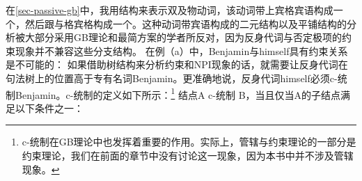 在\ref{sec-passive-gb}中，我用\xbarc 结构来表示双及物动词，该动词带上宾格宾语构成一个\vbarc，然后跟与格宾格构成一个\vbarc。这种动词带宾语构成\vbarc 的二元结构以及平铺结构的分析被大部分采用GB理论和最简方案的学者所反对，因为反身代词与否定极项的约束现象并不兼容这些分支结构。
在例（a）中，Benjamin与himself具有约束关系是不可能的：
\eal
{}
\zl
如果借助树结构来分析约束和NPI现象的话，就需要让反身代词在句法树上的位置高于专有名词Benjamin。更准确地说，反身代词himself必须c-统制Benjamin。c-统制的定义如下所示\citep[]{Adger2003a}：\footnote{%
c-统制在GB理论中也发挥着重要的作用。实际上，管辖与约束理论的一部分是约束理论，我们在前面的章节中没有讨论这一现象，因为本书中并不涉及管辖现象。
}
\ea
结点A c-统制 B，当且仅当A的子结点满足以下条件之一：\\
